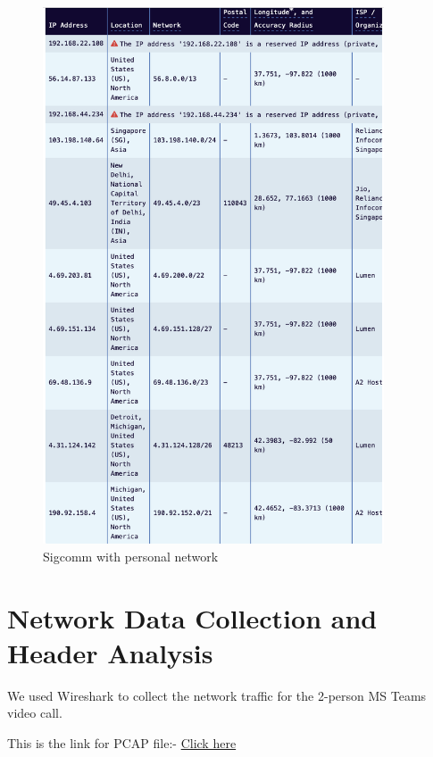 \documentclass{article}
\begin{document}
\begin{itemize}
    \begin{figure}[H]
    \centering
    \includegraphics[width=0.9\textwidth]{geolocation_sigcomm_personal.png}
    \caption*{Sigcomm with personal network}
    \end{figure}
\end{itemize}

\newpage

\section{Network Data Collection and Header Analysis}
We used Wireshark to collect the network traffic for the 2-person MS Teams video call.

This is the link for PCAP file:-
\href{https://csciitd-my.sharepoint.com/:u:/g/personal/cs5221133_iitd_ac_in/EXyzrXDXeWVHmEXI7Gj0ubYBvL5JNiTyRngBvNulR8BsNw?e=OwpG6S}{Click here}
\end{document}
